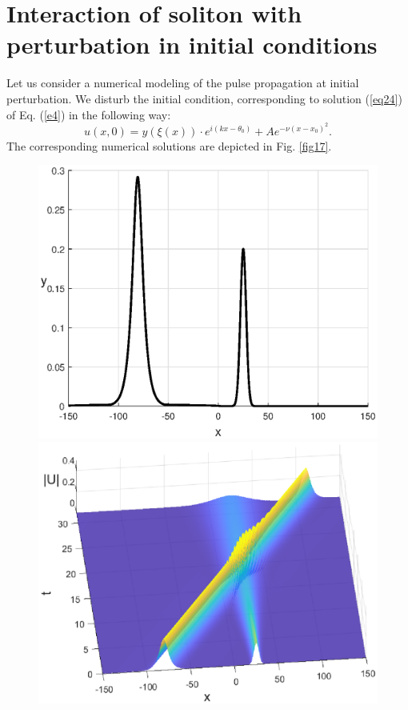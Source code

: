 \documentclass[preprint,12pt]{elsarticle}
\begin{document}
\section{Interaction of soliton with perturbation in initial conditions}\label{ch8}
Let us consider a numerical modeling of the pulse propagation at initial perturbation. We disturb the initial condition, corresponding to solution (\ref{eq24}) of Eq. (\ref{e4}) in the following way:
\begin{equation} \label{eq52}
u(x,0)=y\left(\xi\left(x\right)\right)\cdot e^{i(kx-\theta_{0})}+Ae^{-\nu(x-x_{0})^{2}}.
\end{equation}
The corresponding numerical solutions are depicted in Fig. \ref{fig17}.
\begin{figure}[H] %
\begin{center}
\begin{minipage}[h]{0.48\linewidth}
\includegraphics[width=1\linewidth]{fig18.eps}
\end{minipage}
\hfill
\begin{minipage}[h]{0.48\linewidth}
\includegraphics[width=1\linewidth]{fig19.eps}

\end{minipage}
\end{center}
\end{figure}
\end{document}
